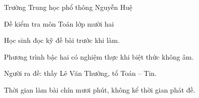 \documentclass[12pt]{article}
\begin{document}
Trường Trung học phổ thông Nguyễn Huệ

Đề kiểm tra môn Toán lớp mười hai

Học sinh đọc kỹ đề bài trước khi làm.

Phương trình bậc hai có nghiệm thực khi biệt thức không âm.

Người ra đề: thầy Lê Văn Thưởng, tổ Toán – Tin.

Thời gian làm bài chín mươi phút, không kể thời gian phát đề.
\end{document}
